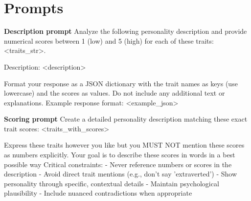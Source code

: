 \documentclass[12pt]{article}
\begin{document}
\section{Prompts} 
\textbf{Description prompt}\newline
Analyze the following personality description and provide numerical scores between 1 (low) and 5 (high) for each of these traits: <traits\_str>.

Description:
<description>

Format your response as a JSON dictionary with the trait names as keys (use lowercase) and the scores as values. Do not include any additional text or explanations.
Example response format:
<example\_json>\newline

\textbf{Scoring prompt}\newline
Create a detailed personality description matching these exact trait scores:
<traits\_with\_scores>

Express these traits however you like but you MUST NOT mention these scores as numbers explicitly. Your goal is to describe these scores in words in a best possible way
Critical constraints:
- Never reference numbers or scores in the description
- Avoid direct trait mentions (e.g., don't say 'extraverted')
- Show personality through specific, contextual details
- Maintain psychological plausibility
- Include nuanced contradictions when appropriate

\printbibliography
    
\end{document}
